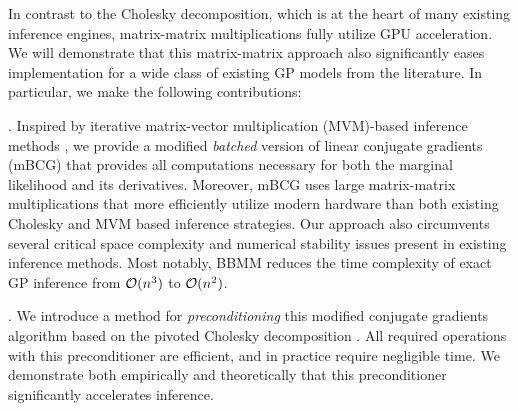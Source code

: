 In contrast to the Cholesky decomposition, which is at the heart of many existing inference engines, matrix-matrix multiplications fully utilize GPU acceleration.
We will demonstrate that this matrix-matrix approach also significantly eases implementation for a wide class of existing GP models from the literature.
In particular, we make the following contributions:

. Inspired by iterative matrix-vector multiplication (MVM)-based inference methods  \cite{cunningham2008fast,saatcci2012scalable,wilson2015kernel,wilson2015thoughts,dong2017scalable}, we provide a modified \emph{batched} version of linear conjugate gradients (mBCG) that provides all computations necessary for both the marginal likelihood and its derivatives.
Moreover, mBCG uses large matrix-matrix multiplications that more efficiently utilize modern hardware than both existing Cholesky and MVM based inference strategies.
Our approach also circumvents several critical space complexity and numerical stability issues present in existing inference methods.
Most notably, BBMM reduces the time complexity of exact GP inference from $\bigo{n^3}$ to $\bigo{n^2}$.

. We introduce a method for \emph{preconditioning} this modified conjugate gradients algorithm based on the pivoted Cholesky decomposition \cite{bach2013sharp,harbrecht2012low}.
All required operations with this preconditioner are efficient, and in practice require negligible time.
We demonstrate both empirically and theoretically that this preconditioner significantly accelerates inference.

